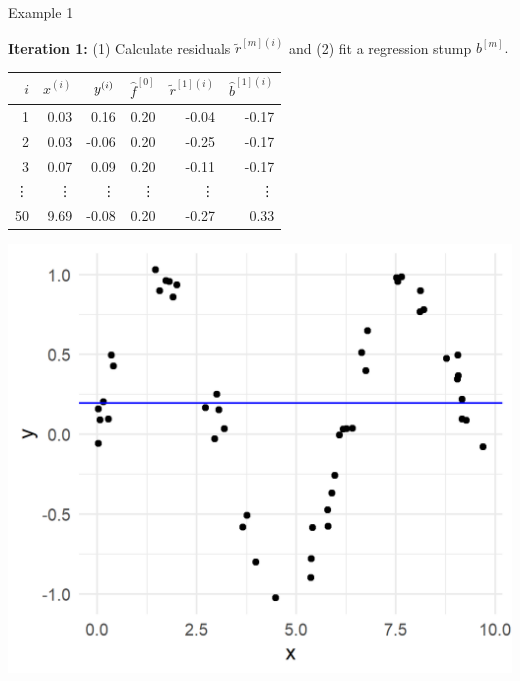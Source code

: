\begin{vbframe}{Example 1}
\begin{footnotesize}
\end{footnotesize}

\framebreak



\begin{footnotesize}

\textbf{Iteration 1:} (1) Calculate residuals $\tilde{r}^{[m](i)}$ and (2) 
fit a regression stump $b^{[m]}.$ %

\vfill

\begin{minipage}[c]{0.5\textwidth}
  \vspace{0pt}%
  \centering
  \scriptsize
  \begin{tabular}{r|r|r|r|r|r}
    $i$ & $x^{(i)}$ & $y^{(i)}$ & $\hat{f}^{[0]}$ & $\tilde{r}^{[1](i)}$ & 
    $\hat{b}^{[1](i)}$\\ 
    \hline
    1 & 0.03 & 0.16 & 0.20 & -0.04 & -0.17 \\
    2 & 0.03 & -0.06 & 0.20 & -0.25 & -0.17 \\
    3 & 0.07 & 0.09 & 0.20 & -0.11 & -0.17 \\
    \vdots & \vdots & \vdots & \vdots & \vdots & \vdots \\
    50 & 9.69 & -0.08 & 0.20 & -0.27 & 0.33 \\
  \end{tabular}
\end{minipage}%
\begin{minipage}[c]{0.05\textwidth}
  \phantom{foo}
\end{minipage}%
\begin{minipage}[c]{0.45\textwidth}
  \vspace{0pt}%
  \includegraphics{figure/gbm_anim_init.png}
\end{minipage}%


\end{footnotesize}
\end{vbframe}
